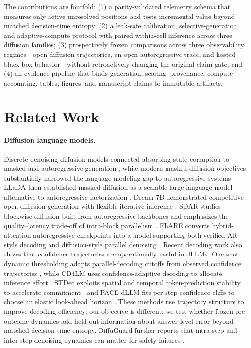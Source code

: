 \documentclass[10pt]{article}
\begin{document}
The contributions are fourfold:
(1) a parity-validated telemetry schema that measures only active unresolved positions and tests incremental value beyond matched decision-time entropy;
(2) a leak-safe calibration, selective-generation, and adaptive-compute protocol with paired within-cell inference across three diffusion families;
(3) prospectively frozen comparisons across three observability regimes---open diffusion trajectories, an open autoregressive trace, and hosted black-box behavior---without retroactively changing the original claim gate; and
(4) an evidence pipeline that binds generation, scoring, provenance, compute accounting, tables, figures, and manuscript claims to immutable artifacts.

\section{Related Work}

\paragraph{Diffusion language models.}
Discrete denoising diffusion models connected absorbing-state corruption to masked and autoregressive generation \citep{austin2021d3pm}, while modern masked diffusion objectives substantially narrowed the language-modeling gap to autoregressive systems \citep{sahoo2024mdlm}.
LLaDA then established masked diffusion as a scalable large-language-model alternative to autoregressive factorization \citep{nie2025llada}.
Dream 7B demonstrated competitive open diffusion generation with flexible iterative inference \citep{ye2025dream}.
SDAR studies blockwise diffusion built from autoregressive backbones and emphasizes the quality--latency trade-off of intra-block parallelism \citep{cheng2026sdar}.
FLARE converts hybrid-attention autoregressive checkpoints into a model supporting both verified AR-style decoding and diffusion-style parallel denoising \citep{zhu2026flare}.
Recent decoding work also shows that confidence trajectories are operationally useful in dLLMs. One-shot dynamic thresholding adapts parallel-decoding cutoffs from observed confidence trajectories \citep{shen2025osdt}, while CD4LM uses confidence-adaptive decoding to allocate inference effort \citep{liang2026cd4lm}. STDec exploits spatial and temporal token-prediction stability to accelerate commitment \citep{chen2026stdec}, and PACE-dLLM fits per-step confidence cliffs to choose an elastic look-ahead horizon \citep{lu2026pacedllm}. These methods use trajectory structure to improve decoding efficiency; our objective is different: we test whether frozen pre-outcome dynamics add held-out information about answer-level error beyond matched decision-time entropy. DiffuGuard further reports that intra-step and inter-step denoising dynamics can matter for safety failures \citep{li2025diffuguard}.
\end{document}
